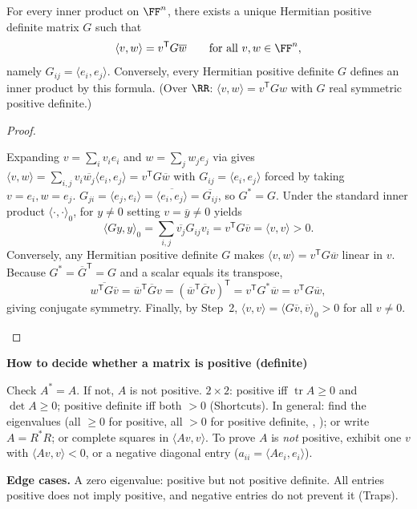 \documentclass[10pt]{scrartcl}
\DeclareMathOperator{\tr}{tr}\DeclareMathOperator{\nul}{null}\DeclareMathOperator{\range}{range}\DeclareMathOperator{\spn}{span}
\newenvironment{methodbox}[1]{\begin{mdframed}[style=mdbluebox,linecolor=NavyBlue,backgroundcolor=NavyBlue!3]\textbf{\color{NavyBlue}#1}\par\vspace{2pt}}{\end{mdframed}}
\begin{document}
\begin{theorem*}
  For every inner product on $\FF^n$, there exists a unique Hermitian positive definite matrix $G$ such that
  \[
    \langle v,w\rangle = v^{\mathsf T}G\overline{w} \qquad \text{for all } v,w\in\FF^n,
  \]
  namely $G_{ij}=\langle e_i,e_j\rangle$. Conversely, every Hermitian positive definite $G$ defines an inner product by this formula. (Over $\RR$: $\langle v,w\rangle=v^{\mathsf T}Gw$ with $G$ real symmetric positive definite.)
\end{theorem*}
\begin{proof}
  \begin{steps}
    \ii Expanding $v=\sum_i v_i e_i$ and $w=\sum_j w_j e_j$ via  gives $\langle v,w\rangle = \sum_{i,j} v_i \overline{w_j}\langle e_i,e_j\rangle = v^{\mathsf T}G\overline{w}$ with $G_{ij}=\langle e_i,e_j\rangle$ forced by taking $v=e_i,w=e_j$.
    \ii $G_{ji}=\langle e_j,e_i\rangle=\overline{\langle e_i,e_j\rangle}=\overline{G_{ij}}$, so $G^*=G$. Under the standard inner product $\langle\cdot,\cdot\rangle_0$, for $y\neq0$ setting $v=\overline{y}\neq0$ yields
    \[ \langle Gy,y\rangle_0 = \sum_{i,j} \overline{v_j} G_{ij} v_i = v^{\mathsf T}G\overline{v} = \langle v,v\rangle > 0. \]
    \ii Conversely, any Hermitian positive definite $G$ makes $\langle v,w\rangle=v^{\mathsf T}G\overline{w}$ linear in $v$. Because $G^*=\overline{G}^{\mathsf T}=G$ and a scalar equals its transpose, 
    \[ \overline{w^{\mathsf T}G\overline{v}}=\overline{w}^{\mathsf T}\overline{G}v = (\overline{w}^{\mathsf T}\overline{G}v)^{\mathsf T} = v^{\mathsf T}G^*\overline{w}=v^{\mathsf T}G\overline{w}, \]
    giving conjugate symmetry. Finally, by Step~2, $\langle v,v\rangle=\langle G\overline{v},\overline{v}\rangle_0 > 0$ for all $v\neq0$.
  \end{steps}
\end{proof}

\begin{methodbox}{How to decide whether a matrix is positive (definite)}
\begin{enumerate}[label=\arabic*.,leftmargin=1.5em,itemsep=2pt,topsep=2pt]
  \ii Check $A^*=A$. If not, $A$ is not positive.
  \ii $2\times2$: positive iff $\tr A\ge0$ and $\det A\ge0$; positive definite iff both $>0$ (Shortcuts).
  \ii In general: find the eigenvalues (all $\ge0$ for positive, all $>0$ for positive definite, , ); or write $A=R^*R$; or complete squares in $\langle Av,v\rangle$.
  \ii To prove $A$ is \emph{not} positive, exhibit one $v$ with $\langle Av,v\rangle<0$, or a negative diagonal entry ($a_{ii}=\langle Ae_i,e_i\rangle$).
\end{enumerate}
\textbf{Edge cases.} A zero eigenvalue: positive but not positive definite. All entries positive does not imply positive, and negative entries do not prevent it (Traps).
\end{methodbox}
\end{document}
